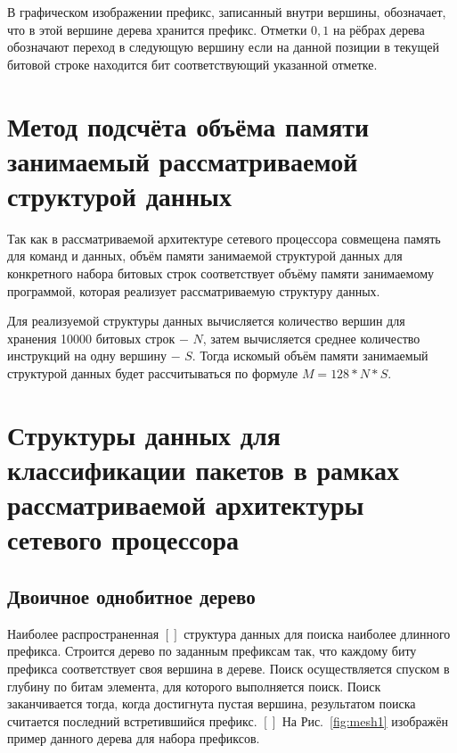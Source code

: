 \documentclass[a4paper, 12pt, titlepage, finall]{extreport}
\begin{document}
        В графическом изображении префикс, записанный внутри вершины, обозначает, что в этой вершине дерева хранится префикс.
        Отметки ${0,1}$ на рёбрах дерева обозначают переход в следующую вершину если на данной позиции в текущей битовой строке находится бит соответствующий указанной отметке.
    \section{Метод подсчёта объёма памяти занимаемый рассматриваемой структурой данных}
        Так как в рассматриваемой архитектуре сетевого процессора совмещена память для команд и данных, объём памяти занимаемой структурой данных 
        для конкретного набора битовых строк соответствует объёму памяти занимаемому программой, которая реализует рассматриваемую структуру данных.

        Для реализуемой структуры данных вычисляется количество вершин для хранения 10000 битовых строк $-$ $N$, затем вычисляется среднее количество инструкций на 
        одну вершину $-$ $S$. Тогда искомый объём памяти занимаемый структурой данных будет рассчитываться по формуле $M = 128 * N * S$.
    \section{Структуры данных для классификации пакетов в рамках рассматриваемой архитектуры сетевого процессора}
        \subsection{Двоичное однобитное дерево}
            Наиболее распространенная $[ ]$ структура данных для поиска наиболее длинного префикса. Строится дерево по заданным префиксам
            так, что каждому биту префикса соответствует своя вершина в дереве. 
            Поиск осуществляется спуском в глубину по битам элемента, для которого выполняется поиск. 
            Поиск заканчивается тогда, когда достигнута пустая вершина, результатом поиска считается последний встретившийся префикс. $[ ]$
            На Рис.~\ref{fig:mesh1} изображён пример данного дерева для набора префиксов.
\end{document}
